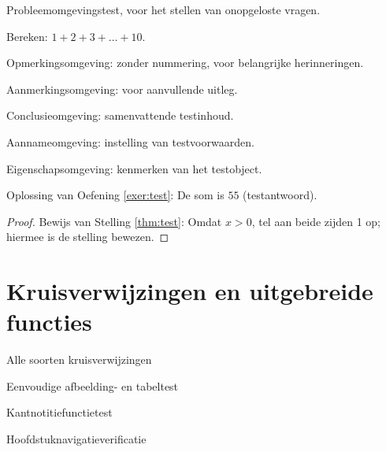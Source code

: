 \documentclass[nl]{../../elegantbook}
\begin{document}
\begin{definition}[Testdefinitie]
\begin{theorem}[Teststelling]
\begin{lemma}[Testlemma]
\begin{corollary}[Testgevolgtrekking]
\begin{axiom}[Testaxioma]
\begin{postulate}[Testpostulaat]
\begin{proposition}[Testpropositie]
\begin{problem}\label{probl:test}
Probleemomgevingstest, voor het stellen van onopgeloste vragen.
\end{problem}

\begin{exercise}\label{exer:test}
Bereken: $1+2+3+\dots+10$.
\end{exercise}

\begin{note}
Opmerkingsomgeving: zonder nummering, voor belangrijke herinneringen.
\end{note}

\begin{remark}
Aanmerkingsomgeving: voor aanvullende uitleg.
\end{remark}

\begin{conclusion}
Conclusieomgeving: samenvattende testinhoud.
\end{conclusion}

\begin{assumption}
Aannameomgeving: instelling van testvoorwaarden.
\end{assumption}

\begin{property}
Eigenschapsomgeving: kenmerken van het testobject.
\end{property}

\begin{solution}
Oplossing van Oefening \ref{exer:test}: De som is $55$ (testantwoord).
\end{solution}

\begin{proof}
Bewijs van Stelling \ref{thm:test}: Omdat $x>0$, tel aan beide zijden 1 op; hiermee is de stelling bewezen.
\end{proof}

\chapter{Kruisverwijzingen en uitgebreide functies}
\begin{introduction}
\item Alle soorten kruisverwijzingen
\item Eenvoudige afbeelding- en tabeltest
\item Kantnotitiefunctietest
\item Hoofdstuknavigatieverificatie
\end{introduction}


\end{proposition}
\end{postulate}
\end{axiom}
\end{corollary}
\end{lemma}
\end{theorem}
\end{definition}
\end{document}
